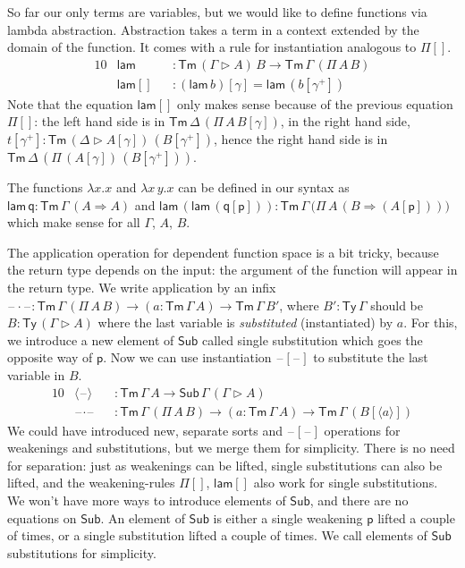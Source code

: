 \documentclass[sigplan,10pt,anonymous,review]{acmart}\settopmatter{printfolios=true,printccs=false,printacmref=false}
\newcommand{\ra}{\rightarrow}
\newcommand{\Ra}{\Rightarrow}
\newcommand{\Ty}{\mathsf{Ty}}
\newcommand{\Tm}{\mathsf{Tm}}
\newcommand{\Sub}{\mathsf{Sub}}
\newcommand{\p}{\mathsf{p}}
\newcommand{\q}{\mathsf{q}}
\newcommand{\ext}{\mathop{\triangleright}}
\newcommand{\lam}{\mathsf{lam}}
\newcommand{\blank}{\mathord{\hspace{1pt}\text{--}\hspace{1pt}}} %
\begin{document}
So far our only terms are variables, but we would like to define
functions via lambda abstraction. Abstraction takes a term in a
context extended by the domain of the function. It comes with a rule
for instantiation analogous to $\Pi[]$.
\begin{alignat*}{10}
& \lam && : \Tm\,(\Gamma\ext A)\,B\ra\Tm\,\Gamma\,(\Pi\,A\,B) \\
& \lam[] && : (\lam\,b)[\gamma] = \lam\,(b[\gamma^+])
\end{alignat*}
Note that the equation $\lam[]$ only makes sense because of the
previous equation $\Pi[]$: the left hand side is in
$\Tm\,\Delta\,(\Pi\,A\,B[\gamma])$, in the right hand side,
$t[\gamma^+] : \Tm\,(\Delta\ext A[\gamma])\,(B[\gamma^+])$, hence the
right hand side is in
$\Tm\,\Delta\,(\Pi\,(A[\gamma])\,(B[\gamma^+]))$.

The functions $\lambda x.x$ and $\lambda x\,y.x$ can be defined in our
syntax as $\lam\,\q : \Tm\,\Gamma\,(A\Ra A)$ and
$\lam\,(\lam\,(\q[\p])) :
\Tm\,\Gamma\,\big(\Pi\,A\,(B\Ra(A[\p]))\big)$ which make sense for all
$\Gamma$, $A$, $B$.

The application operation for dependent function space is a bit
tricky, because the return type depends on the input: the argument of
the function will appear in the return type. We write application by
an infix $\blank\cdot\blank :
\Tm\,\Gamma\,(\Pi\,A\,B)\ra(a:\Tm\,\Gamma\,A)\ra\Tm\,\Gamma\,B'$,
where $B' : \Ty\,\Gamma$ should be $B:\Ty\,(\Gamma\ext A)$ where the
last variable is \emph{substituted} (instantiated) by $a$. For this,
we introduce a new element of $\Sub$ called single substitution which
goes the opposite way of $\p$. Now we can use instantiation
$\blank[\blank]$ to substitute the last variable in $B$.
\begin{alignat*}{10}
& \langle\blank\rangle && : \Tm\,\Gamma\,A\ra\Sub\,\Gamma\,(\Gamma\ext A) \\
& \blank\cdot\blank && : \Tm\,\Gamma\,(\Pi\,A\,B)\ra(a:\Tm\,\Gamma\,A)\ra\Tm\,\Gamma\,(B[\langle a\rangle])
\end{alignat*}
We could have introduced new, separate sorts and $\blank[\blank]$
operations for weakenings and substitutions, but we merge them for
simplicity. There is no need for separation: just as weakenings can be
lifted, single substitutions can also be lifted, and the
weakening-rules $\Pi[]$, $\lam[]$ also work for single
substitutions. We won't have more ways to introduce elements of
$\Sub$, and there are no equations on $\Sub$. An element of $\Sub$ is
either a single weakening $\p$ lifted a couple of times, or a single
substitution lifted a couple of times. We call elements of $\Sub$
substitutions for simplicity.
\end{document}
